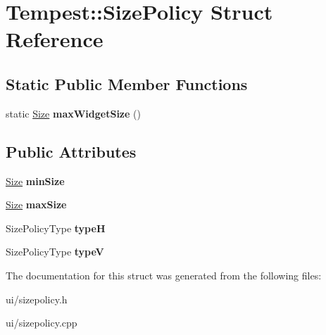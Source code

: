 \hypertarget{struct_tempest_1_1_size_policy}{\section{Tempest\+:\+:Size\+Policy Struct Reference}
\label{struct_tempest_1_1_size_policy}
}
\subsection*{Static Public Member Functions}
\begin{DoxyCompactItemize}
\item 
\hypertarget{struct_tempest_1_1_size_policy_a634234062823f2da9e419b47e1ce7095}{static \hyperlink{struct_tempest_1_1_size}{Size} {\bfseries max\+Widget\+Size} ()}\label{struct_tempest_1_1_size_policy_a634234062823f2da9e419b47e1ce7095}

\end{DoxyCompactItemize}
\subsection*{Public Attributes}
\begin{DoxyCompactItemize}
\item 
\hypertarget{struct_tempest_1_1_size_policy_adb44f1940a3b7516424195b30e836198}{\hyperlink{struct_tempest_1_1_size}{Size} {\bfseries min\+Size}}\label{struct_tempest_1_1_size_policy_adb44f1940a3b7516424195b30e836198}

\item 
\hypertarget{struct_tempest_1_1_size_policy_acdf60c4f924d277facc0f7a5e382eabf}{\hyperlink{struct_tempest_1_1_size}{Size} {\bfseries max\+Size}}\label{struct_tempest_1_1_size_policy_acdf60c4f924d277facc0f7a5e382eabf}

\item 
\hypertarget{struct_tempest_1_1_size_policy_a64b9974103d051402d79db12e2e1b634}{Size\+Policy\+Type {\bfseries type\+H}}\label{struct_tempest_1_1_size_policy_a64b9974103d051402d79db12e2e1b634}

\item 
\hypertarget{struct_tempest_1_1_size_policy_a1d5064a8cabc76f7018a6690cbea011d}{Size\+Policy\+Type {\bfseries type\+V}}\label{struct_tempest_1_1_size_policy_a1d5064a8cabc76f7018a6690cbea011d}

\end{DoxyCompactItemize}


The documentation for this struct was generated from the following files\+:\begin{DoxyCompactItemize}
\item 
ui/sizepolicy.\+h\item 
ui/sizepolicy.\+cpp\end{DoxyCompactItemize}
